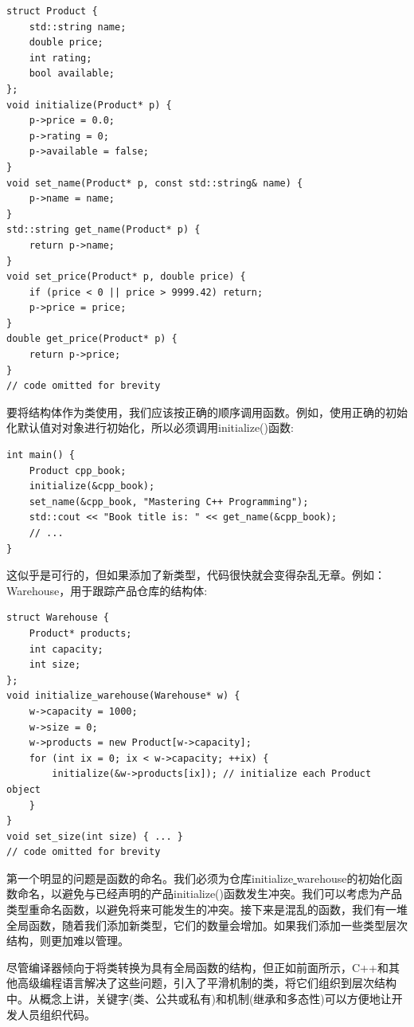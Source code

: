 \begin{lstlisting}[caption={}]
struct Product {
	std::string name;
	double price;
	int rating;
	bool available;
};
void initialize(Product* p) {
	p->price = 0.0;
	p->rating = 0;
	p->available = false;
}
void set_name(Product* p, const std::string& name) {
	p->name = name;
}
std::string get_name(Product* p) {
	return p->name;
}
void set_price(Product* p, double price) {
	if (price < 0 || price > 9999.42) return;
	p->price = price;
}
double get_price(Product* p) {
	return p->price;
}
// code omitted for brevity
\end{lstlisting}

要将结构体作为类使用，我们应该按正确的顺序调用函数。例如，使用正确的初始化默认值对对象进行初始化，所以必须调用initialize()函数:\par

\begin{lstlisting}[caption={}]
int main() {
	Product cpp_book;
	initialize(&cpp_book);
	set_name(&cpp_book, "Mastering C++ Programming");
	std::cout << "Book title is: " << get_name(&cpp_book);
	// ...
}
\end{lstlisting}

这似乎是可行的，但如果添加了新类型，代码很快就会变得杂乱无章。例如：Warehouse，用于跟踪产品仓库的结构体: \par

\begin{lstlisting}[caption={}]
struct Warehouse {
	Product* products;
	int capacity;
	int size;
};
void initialize_warehouse(Warehouse* w) {
	w->capacity = 1000;
	w->size = 0;
	w->products = new Product[w->capacity];
	for (int ix = 0; ix < w->capacity; ++ix) {
		initialize(&w->products[ix]); // initialize each Product object
	}
}
void set_size(int size) { ... }
// code omitted for brevity
\end{lstlisting}

第一个明显的问题是函数的命名。我们必须为仓库initialize\underline{ }warehouse的初始化函数命名，以避免与已经声明的产品initialize()函数发生冲突。我们可以考虑为产品类型重命名函数，以避免将来可能发生的冲突。接下来是混乱的函数，我们有一堆全局函数，随着我们添加新类型，它们的数量会增加。如果我们添加一些类型层次结构，则更加难以管理。\par
尽管编译器倾向于将类转换为具有全局函数的结构，但正如前面所示，C++和其他高级编程语言解决了这些问题，引入了平滑机制的类，将它们组织到层次结构中。从概念上讲，关键字(类、公共或私有)和机制(继承和多态性)可以方便地让开发人员组织代码。 \par

